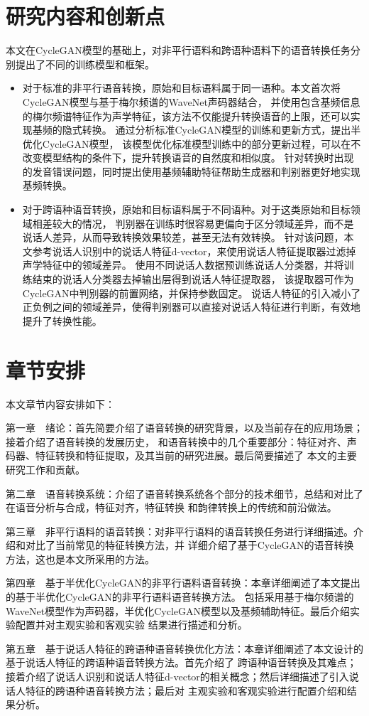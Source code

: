 \section{研究内容和创新点}
本文在CycleGAN模型的基础上，对非平行语料和跨语种语料下的语音转换任务分别提出了不同的训练模型和框架。

\begin{itemize}
    \item 对于标准的非平行语音转换，原始和目标语料属于同一语种。本文首次将CycleGAN模型与基于梅尔频谱的WaveNet声码器结合，
    并使用包含基频信息的梅尔频谱特征作为声学特征，该方法不仅能提升转换语音的上限，还可以实现基频的隐式转换。
    通过分析标准CycleGAN模型的训练和更新方式，提出半优化CycleGAN模型，
    该模型优化标准模型训练中的部分更新过程，可以在不改变模型结构的条件下，提升转换语音的自然度和相似度。
    针对转换时出现的发音错误问题，同时提出使用基频辅助特征帮助生成器和判别器更好地实现基频转换。
    \item 对于跨语种语音转换，原始和目标语料属于不同语种。对于这类原始和目标领域相差较大的情况，
    判别器在训练时很容易更偏向于区分领域差异，而不是说话人差异，从而导致转换效果较差，甚至无法有效转换。
    针对该问题，本文参考说话人识别中的说话人特征d-vector，来使用说话人特征提取器过滤掉声学特征中的领域差异。
    使用不同说话人数据预训练说话人分类器，并将训练结束的说话人分类器去掉输出层得到说话人特征提取器，
    该提取器可作为CycleGAN中判别器的前置网络，并保持参数固定。
    说话人特征的引入减小了正负例之间的领域差异，使得判别器可以直接对说话人特征进行判断，有效地提升了转换性能。
\end{itemize}


\section{章节安排}
本文章节内容安排如下：

第一章　绪论：首先简要介绍了语音转换的研究背景，以及当前存在的应用场景；接着介绍了语音转换的发展历史，
和语音转换中的几个重要部分：特征对齐、声码器、特征转换和特征提取，及其当前的研究进展。最后简要描述了
本文的主要研究工作和贡献。

第二章　语音转换系统：介绍了语音转换系统各个部分的技术细节，总结和对比了在语音分析与合成，特征对齐，特征转换
和韵律转换上的传统和前沿做法。

第三章　非平行语料的语音转换：对非平行语料的语音转换任务进行详细描述。介绍和对比了当前常见的特征转换方法，并
详细介绍了基于CycleGAN的语音转换方法，这也是本文所采用的方法。

第四章　基于半优化CycleGAN的非平行语料语音转换：本章详细阐述了本文提出的基于半优化CycleGAN的非平行语料语音转换方法。
包括采用基于梅尔频谱的WaveNet模型作为声码器，半优化CycleGAN模型以及基频辅助特征。最后介绍实验配置并对主观实验和客观实验
结果进行描述和分析。

第五章　基于说话人特征的跨语种语音转换优化方法：本章详细阐述了本文设计的基于说话人特征的跨语种语音转换方法。首先介绍了
跨语种语音转换及其难点；接着介绍了说话人识别和说话人特征d-vector的相关概念；然后详细描述了引入说话人特征的跨语种语音转换方法；最后对
主观实验和客观实验进行配置介绍和结果分析。

